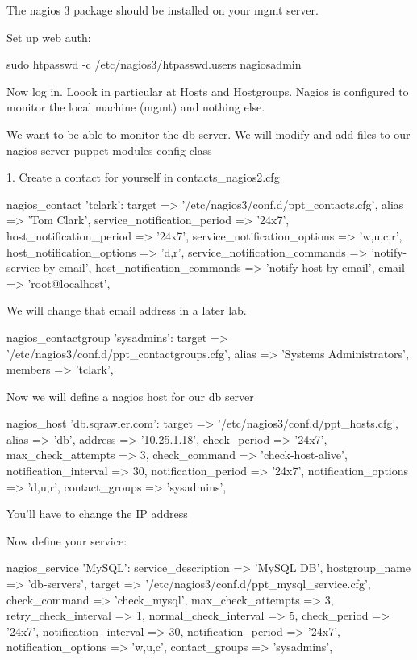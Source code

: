 The nagios 3 package should be installed on your mgmt server.

Set up web auth:

sudo htpasswd -c /etc/nagios3/htpasswd.users nagiosadmin

Now log in.  Loook in particular at Hosts and Hostgroups.  Nagios is configured
to monitor the local machine (mgmt) and nothing else.

We want to be able to monitor the db server.  We will modify and add files to
our nagios-server puppet modules config class

1.  Create a contact for yourself in contacts_nagios2.cfg

nagios_contact { 'tclark':
              target => '/etc/nagios3/conf.d/ppt_contacts.cfg',
              alias => 'Tom Clark',
              service_notification_period => '24x7',
              host_notification_period => '24x7',
              service_notification_options => 'w,u,c,r',
              host_notification_options => 'd,r',
              service_notification_commands => 'notify-service-by-email',
              host_notification_commands => 'notify-host-by-email',
              email => 'root@localhost',
  }


We will change that email address in a later lab.


 nagios_contactgroup { 'sysadmins':
               target => '/etc/nagios3/conf.d/ppt_contactgroups.cfg',
               alias => 'Systems Administrators',
               members => 'tclark', 
  }



Now we will define a nagios host for our db server

 nagios_host { 'db.sqrawler.com':
                 target => '/etc/nagios3/conf.d/ppt_hosts.cfg',
                 alias => 'db',
                 address => '10.25.1.18',
                 check_period => '24x7',
                 max_check_attempts => 3,
                 check_command => 'check-host-alive',
                 notification_interval => 30,
                 notification_period => '24x7',
                 notification_options => 'd,u,r',
                 contact_groups => 'sysadmins',
              }

You'll have to change the IP address 

Now define your service:

nagios_service {'MySQL':
              service_description => 'MySQL DB',
              hostgroup_name => 'db-servers',
              target => '/etc/nagios3/conf.d/ppt_mysql_service.cfg',
              check_command => 'check_mysql',
              max_check_attempts => 3,
              retry_check_interval => 1,
              normal_check_interval => 5,
              check_period => '24x7',
              notification_interval => 30,
              notification_period => '24x7',
              notification_options => 'w,u,c',
              contact_groups => 'sysadmins',
  }


